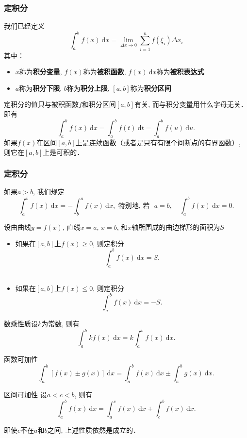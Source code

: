 \documentclass[
10pt,
aspectratio=43,
]{beamer}
\begin{document}
\begin{frame}
	\frametitle{定积分}
	我们已经定义
	\[
		\int_a^b f(x)\mathrm{~d}x  = \lim_{\Delta x\to 0} \sum_{i=1}^n f(\xi_i)\Delta x_i
	\]
	其中：
	\begin{itemize}
		\item<1-> $x$称为{\bf 积分变量}, $f(x)$称为{\bf 被积函数}, $f(x)\mathrm{~d}x$称为{\bf 被积表达式}
		\item<2-> $a$称为{\bf 积分下限}, $b$称为{\bf 积分上限}, $[a,b]$称为{\bf 积分区间}
	\end{itemize}
	\pause
	\begin{block}{}
		定积分的值只与被积函数$f$和积分区间$[a,b]$有关, 而与积分变量用什么字母无关．即有
		\[
			\int_a^b f(x)\mathrm{~d}x = \int_a^b f(t)\mathrm{~d}t = \int_a^b f(u)\mathrm{~d}u.
		\]
		如果$f(x)$在区间$[a,b]$上是连续函数（或者是只有有限个间断点的有界函数）, 则它在$[a,b]$上是可积的．
	\end{block}
\end{frame}

\begin{frame}
	\frametitle{定积分}
	\begin{block}{}
		如果$a>b$, 我们规定
		$$
			\int_a^b f(x)\mathrm{~d} x = -\int_b^a f(x)\mathrm{~d} x,\text{ 特别地, 若 }\,\,a=b,\quad \int_a^b f(x)\mathrm{~d} x = 0 .
		$$
	\end{block}
	\begin{block}{}
		设由曲线$y=f(x)$, 直线$x=a$, $x=b$, 和$x$轴所围成的曲边梯形的面积为$S$
		\begin{itemize}
			\item 如果在$[a,b]$上$f(x)\geq 0$, 则定积分
			      $$
				      \int_a^b f(x)\mathrm{~d} x=S.
			      $$\
			\item 如果在$[a,b]$上$f(x)\leq 0$, 则定积分$$\int_a^b f(x)\mathrm{~d} x=-S.$$
		\end{itemize}
	\end{block}
\end{frame}


\begin{frame}
	\begin{block}{数乘性质}设$k$为常数, 则有
		\[
			\int_a^b kf(x)\mathrm{~d} x=k\int_a^b f(x)\mathrm{~d} x.
		\]
	\end{block}
	\pause
	\begin{block}{函数可加性}
		\[
			\int_a^b [f(x) \pm g(x)]\mathrm{~d} x = \int_a^b f(x)\mathrm{~d} x \pm \int_a^b g(x) \mathrm{~d} x.
		\]
	\end{block}
	\pause
	\begin{block}{区间可加性}
		设$a<c<b$, 则有
		\[
			\int_a^b f(x)\mathrm{~d} x = \int_a^c f(x)\mathrm{~d} x + \int_c^b f(x)\mathrm{~d} x.
		\]
	\end{block}
	\pause
	即使$c$不在$a$和$b$之间, 上述性质依然是成立的．
\end{frame}
\end{document}
